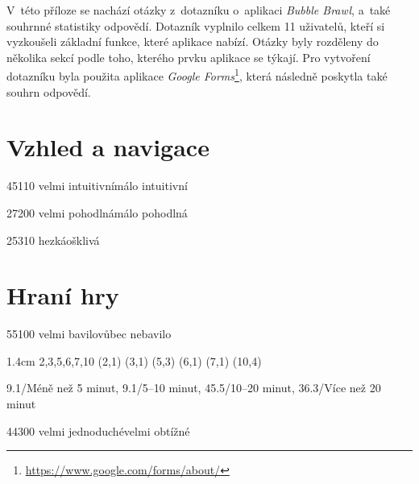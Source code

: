 \newcommand{\questionnairefreetext}[2]{
\noindent \begin{minipage}{\textwidth}
\textbf{#1}
#2
\end{minipage}
\bigskip
}

\newcommand{\questionnairefreetextanswer}[1]{\begin{quote}
    #1
\end{quote}}

V~této příloze se nachází otázky z~dotazníku o~aplikaci \emph{Bubble Brawl}, a~také souhrnné statistiky odpovědí. Dotazník vyplnilo celkem 11 uživatelů, kteří si vyzkoušeli základní funkce, které aplikace nabízí. Otázky byly rozděleny do několika sekcí podle toho, kterého prvku aplikace se týkají. Pro vytvoření dotazníku byla použita aplikace \emph{Google Forms}\footnote{\url{https://www.google.com/forms/about/}}, která následně poskytla také souhrn odpovědí.

\section*{Vzhled a navigace}

{4}{5}{1}{1}{0}
{velmi intuitivní}{málo intuitivní}

{2}{7}{2}{0}{0}
{velmi pohodlná}{málo pohodlná}

{2}{5}{3}{1}{0}
{hezká}{ošklivá}

\section*{Hraní hry}

{5}{5}{1}{0}{0}
{velmi bavilo}{vůbec nebavilo}

{1.4cm}
{2,3,5,6,7,10}
{(2,1) (3,1) (5,3) (6,1) (7,1) (10,4)}

{9.1/Méně než 5 minut, 9.1/5--10 minut, 45.5/10--20 minut, 36.3/Více než 20 minut}

{4}{4}{3}{0}{0}
{velmi jednoduché}{velmi obtížné}

